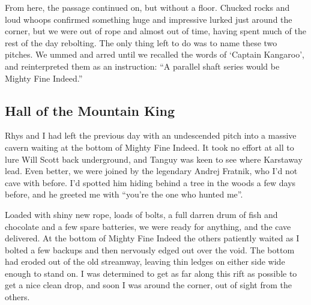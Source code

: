 From here, the passage continued on, but without a floor. Chucked rocks and loud whoops confirmed something huge and impressive lurked just around the corner, but we were out of rope and almost out of time, having spent much of the rest of the day rebolting. The only thing left to do was to name these two pitches. We ummed and arred until we recalled the words of ‘Captain Kangaroo’, and reinterpreted them as an instruction: “A parallel shaft series would be Mighty Fine Indeed.”

\subsection{Hall of the Mountain King}
\begin{marginfigure}
\end{marginfigure}
Rhys and I had left the previous day with an undescended pitch into a massive cavern waiting at the bottom of Mighty Fine Indeed. It took no effort at all to lure Will Scott back underground, and Tanguy was keen to see where Karstaway lead. Even better, we were joined by the legendary Andrej Fratnik, who I’d not cave with before. I’d spotted him hiding behind a tree in the woods a few days before, and he greeted me with “you’re the one who hunted me”.
 
Loaded with shiny new rope, loads of bolts, a full darren drum of fish and chocolate and a few spare batteries, we were ready for anything, and the cave delivered. At the bottom of Mighty Fine Indeed the others patiently waited as I bolted a few backups and then nervously edged out over the void. The bottom had eroded out of the old streamway, leaving thin ledges on either side wide enough to stand on. I was determined to get as far along this rift as possible to get a nice clean drop, and soon I was around the corner, out of sight from the others.  

